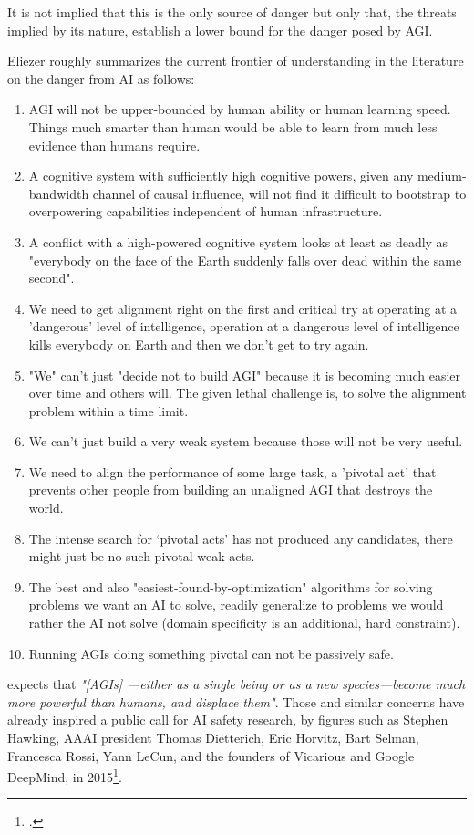\documentclass[12pt, a4paper]{article}
\begin{document}
			It is not implied that this is the only source of danger but only that, the threats implied by its nature, establish a lower bound for the danger posed by AGI.
			
			Eliezer \textcite{Yudkowsky22} roughly summarizes the current frontier of understanding in the literature on the danger from AI as follows:
			\begin{enumerate}
				\item AGI will not be upper-bounded by human ability or human learning speed. Things much smarter than human would be able to learn from much less evidence than humans require.
				\item  A cognitive system with sufficiently high cognitive powers, given any medium-bandwidth channel of causal influence, will not find it difficult to bootstrap to overpowering capabilities independent of human infrastructure.
				\item  	A conflict with a high-powered cognitive system looks at least as deadly as "everybody on the face of the Earth suddenly falls over dead within the same second".
				\item 	We need to get alignment right on the first and critical try at operating at a 'dangerous' level of intelligence, operation at a dangerous level of intelligence kills everybody on Earth and then we don't get to try again. 
				\item 	"We" can't just "decide not to build AGI" because it is becoming much easier over time and others will.	The given lethal challenge is, to solve the alignment problem within a time limit.
				\item 	We can't just build a very weak system because those will not be very useful.
				\item 	We need to align the performance of some large task, a 'pivotal act' that prevents other people from building an unaligned AGI that destroys the world.
				\item 	The intense search for ‘pivotal acts' has not produced any candidates, there might just be no such pivotal weak acts.
				\item 	The best and also "easiest-found-by-optimization" algorithms for solving problems we want an AI to solve, readily generalize to problems we would rather the AI not solve (domain specificity is an additional, hard constraint).
				\item 	Running AGIs doing something pivotal can not be passively safe.
			\end{enumerate}
			\textcite{bostrom2014superintelligence} expects that \textit{"[AGIs] —either as a single being or as a new species—become much more powerful than humans, and displace them"}.
			Those and similar concerns have already inspired a public call for AI safety research, by figures such as Stephen Hawking, AAAI president Thomas Dietterich, Eric Horvitz, Bart Selman, Francesca Rossi, Yann LeCun, and the founders of Vicarious and Google DeepMind, in 2015\footcite{RussellLetter}.
					
\end{document}
